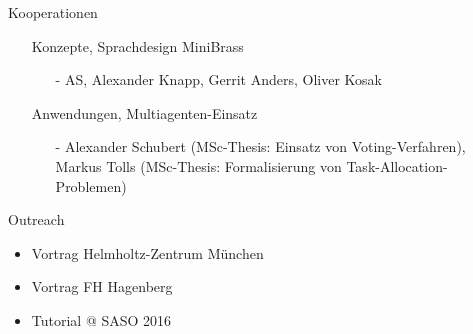 
\begin{frame}{Kooperationen}
\begin{itemize}
\item[] \alert{Konzepte, Sprachdesign MiniBrass}
\begin{itemize}
\item[-] AS, Alexander Knapp, Gerrit Anders, Oliver Kosak
\end{itemize}
\item[] \alert{Anwendungen, Multiagenten-Einsatz}
\begin{itemize}
\item[-] Alexander Schubert (MSc-Thesis: Einsatz von Voting-Verfahren), Markus Tolls (MSc-Thesis: Formalisierung von Task-Allocation-Problemen)
\end{itemize}
\end{itemize}
\end{frame}

\begin{frame}{Outreach}
\begin{itemize}
\item Vortrag Helmholtz-Zentrum München
\item Vortrag FH Hagenberg
\item Tutorial @ SASO 2016
\end{itemize}
\end{frame}